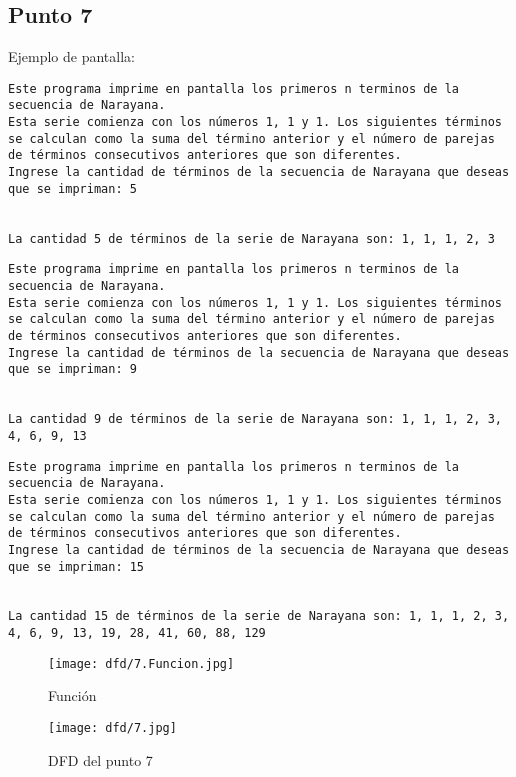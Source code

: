 



\subsection{Punto 7}
	
	Ejemplo de pantalla:
\begin{lstlisting}
Este programa imprime en pantalla los primeros n terminos de la secuencia de Narayana.
Esta serie comienza con los números 1, 1 y 1. Los siguientes términos
se calculan como la suma del término anterior y el número de parejas
de términos consecutivos anteriores que son diferentes.
Ingrese la cantidad de términos de la secuencia de Narayana que deseas que se impriman: 5


La cantidad 5 de términos de la serie de Narayana son: 1, 1, 1, 2, 3
\end{lstlisting}

\begin{lstlisting}
Este programa imprime en pantalla los primeros n terminos de la secuencia de Narayana.
Esta serie comienza con los números 1, 1 y 1. Los siguientes términos
se calculan como la suma del término anterior y el número de parejas
de términos consecutivos anteriores que son diferentes.
Ingrese la cantidad de términos de la secuencia de Narayana que deseas que se impriman: 9


La cantidad 9 de términos de la serie de Narayana son: 1, 1, 1, 2, 3, 4, 6, 9, 13
\end{lstlisting}

\begin{lstlisting}
Este programa imprime en pantalla los primeros n terminos de la secuencia de Narayana.
Esta serie comienza con los números 1, 1 y 1. Los siguientes términos
se calculan como la suma del término anterior y el número de parejas
de términos consecutivos anteriores que son diferentes.
Ingrese la cantidad de términos de la secuencia de Narayana que deseas que se impriman: 15


La cantidad 15 de términos de la serie de Narayana son: 1, 1, 1, 2, 3, 4, 6, 9, 13, 19, 28, 41, 60, 88, 129
\end{lstlisting}

\begin{figure}
    \centering
    \texttt{[image: dfd/7.Funcion.jpg]}
    \caption{ Función}
    \label{fig: Función}
\end{figure}  
\begin{figure}
  \centering
  \texttt{[image: dfd/7.jpg]}
  \caption{ DFD del punto 7}
  \label{fig: DFD del punto 7}
\end{figure}


